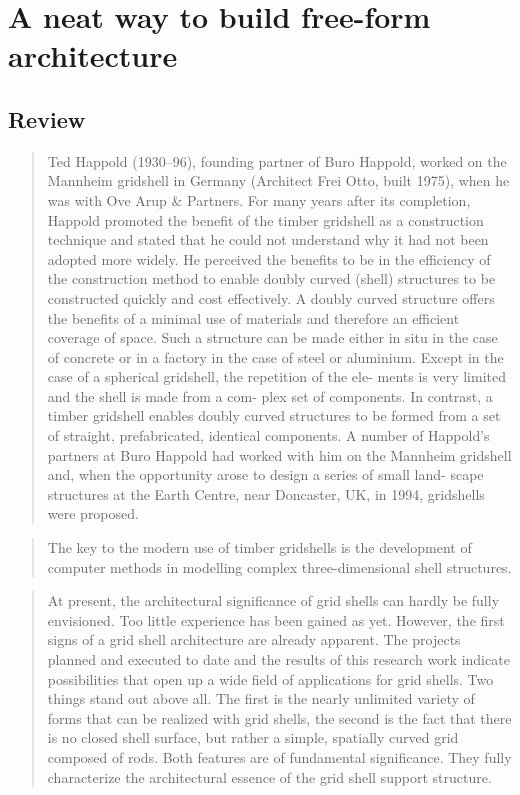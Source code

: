 
\chapter{A neat way to build free-form architecture}
%

\section{Review}

\blockcquote[][p.~2]{Harris2003}{Ted Happold (1930–96), founding partner of Buro Happold, worked on the Mannheim gridshell in Germany (Architect Frei Otto, built 1975), when he was with Ove Arup \& Partners. For many years after its completion, Happold promoted the benefit of the timber gridshell as a construction technique and stated that he could not understand why it had not been adopted more widely. He perceived the benefits to be in the efficiency of the construction method to enable doubly curved (shell) structures to be constructed quickly and cost effectively. A doubly curved structure offers the benefits of a minimal use of materials and therefore an efficient coverage of space. Such a structure can be made either in situ in the case of concrete or in a factory in the case of steel or aluminium. Except in the case of a spherical gridshell, the repetition of the ele- ments is very limited and the shell is made from a com- plex set of components. In contrast, a timber gridshell enables doubly curved structures to be formed from a set of straight, prefabricated, identical components. A number of Happold’s partners at Buro Happold had worked with him on the Mannheim gridshell and, when the opportunity arose to design a series of small land- scape structures at the Earth Centre, near Doncaster, UK, in 1994, gridshells were proposed.}

\blockcquote[][p.~2]{Harris2003}{The key to the modern use of timber gridshells is the development of computer methods in modelling complex three-dimensional shell structures. }

\blockcquote[][p.~250]{Otto1974}{At present, the architectural significance of grid shells can hardly be fully envisioned. Too little experience has been gained as yet. However, the first signs of a grid shell architecture are already apparent. The projects planned and executed to date and the results of this research work indicate possibilities that open up a wide field of applications for grid shells. Two things stand out above all. The first is the nearly unlimited variety of forms that can be realized with grid shells, the second is the fact that there is no closed shell surface, but rather a simple, spatially curved grid composed of rods. Both features are of fundamental significance. They fully characterize the architectural essence of the grid shell support structure.}
\clearpage

